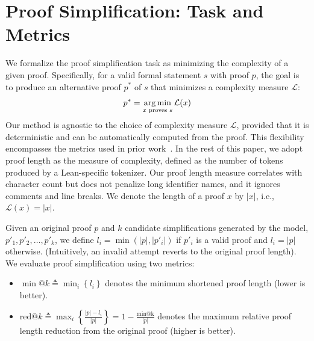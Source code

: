 \section{Proof Simplification: Task and Metrics} \label{sec:task-metrics}

We formalize the proof simplification task as minimizing the complexity of a given proof. Specifically, for a valid formal statement $s$ with proof $p$, the goal is to produce an alternative proof $p^*$ of $s$ that minimizes a complexity measure $\mathcal{L}$:
\vspace{-6pt}
\begin{equation*}
p^* = \operatorname*{arg\,min}_{x \text{ proves } s} \mathcal{L}(x)
\end{equation*}
%
Our method is agnostic to the choice of complexity measure $\mathcal{L}$, provided that it is deterministic and can be automatically computed from the proof. This flexibility encompasses the metrics used in prior work~\citep{ahuja2024improver}. In the rest of this paper, we adopt proof length as the measure of complexity, defined as the number of tokens produced by a Lean-specific tokenizer. Our proof length measure correlates with character count but does not penalize long identifier names, and it ignores comments and line breaks. We denote the length of a proof $x$ by $|x|$, i.e., $\mathcal{L}(x) = |x|$.



Given an original proof $p$ and $k$ candidate simplifications generated by the model, $p'_1, p'_2, \ldots, p'_k$, we define $l_i = \min(|p|, |p'_i|)$ if $p'_i$ is a valid proof and $l_i = |p|$ otherwise. (Intuitively, an invalid attempt reverts to the original proof length). We evaluate proof simplification using two metrics:

\begin{itemize}[topsep=0pt, leftmargin=0.7cm]
\itemsep1pt
    \item $\min@k \triangleq \min_i \left\{ l_i \right\}$ denotes the minimum shortened proof length (lower is better).
    \item $\mathrm{red}@k \triangleq \max_i \left\{ \frac{|p|-l_i}{|p|} \right\} = 1 - \frac{\text{min@k}}{|p|}$ denotes the maximum relative proof length reduction from the original proof (higher is better).
\end{itemize}
%

